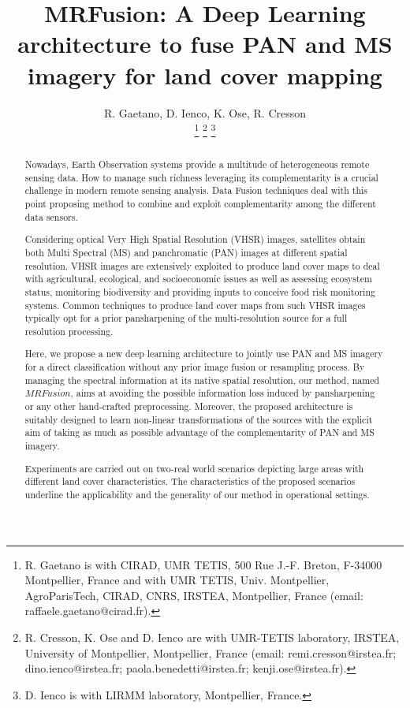 \documentclass[journal]{IEEEtran}
\newcommand{\method}{$MRFusion$}
\begin{document}
\title{MRFusion: A Deep Learning architecture to fuse PAN and MS imagery for land cover mapping}


\author{R. Gaetano,
        D. Ienco,
        K. Ose,
        R. Cresson
        
        
\thanks{R. Gaetano is with CIRAD, UMR TETIS, 500 Rue J.-F. Breton, F-34000 Montpellier, France and with UMR TETIS, Univ. Montpellier, AgroParisTech, CIRAD, CNRS, IRSTEA, Montpellier, France (email: raffaele.gaetano@cirad.fr).}
\thanks{R. Cresson, K. Ose and D. Ienco are with UMR-TETIS laboratory, IRSTEA, University of Montpellier, Montpellier, France (email: remi.cresson@irstea.fr; dino.ienco@irstea.fr; paola.benedetti@irstea.fr; kenji.ose@irstea.fr).}
\thanks{D. Ienco is with LIRMM laboratory, Montpellier, France.} }

\maketitle

\begin{abstract}
Nowadays, Earth Observation systems provide a multitude of heterogeneous remote sensing data. How to manage such richness leveraging its complementarity is a crucial challenge in modern remote sensing analysis. Data Fusion techniques deal with this point proposing method to combine and exploit complementarity among the different data sensors. 

Considering optical Very High Spatial Resolution (VHSR) images, satellites obtain both Multi Spectral (MS) and panchromatic (PAN) images at different spatial resolution. VHSR images are extensively exploited to produce land cover maps to deal with agricultural, ecological, and socioeconomic issues as well as assessing ecosystem status, monitoring biodiversity and providing inputs to conceive food risk monitoring systems. Common techniques to produce land cover maps from such VHSR images typically opt for a prior pansharpening of the multi-resolution source for a full resolution processing.

Here, we propose a new deep learning architecture to jointly use PAN and MS imagery for a direct classification without any prior image fusion or resampling process. By managing the spectral information at its native spatial resolution, our method, named \method{}, aims at avoiding the possible information loss induced by pansharpening or any other hand-crafted preprocessing. Moreover, the proposed architecture is suitably designed to learn non-linear transformations of the sources with the explicit aim of taking as much as possible advantage of the complementarity of PAN and MS imagery.%

Experiments are carried out on two-real world scenarios depicting large areas with different land cover characteristics. The characteristics of the proposed scenarios underline the applicability and the generality of our method in operational settings.
\end{abstract}
\end{document}
